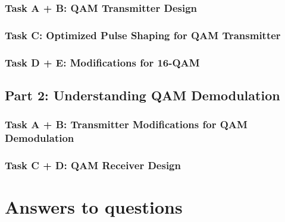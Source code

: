 \documentclass{article}
\begin{document}
\subsubsection{Task A + B: QAM Transmitter Design}

\subsubsection{Task C: Optimized Pulse Shaping for QAM Transmitter}

\subsubsection{Task D + E: Modifications for 16-QAM}

\subsection{Part 2: Understanding QAM Demodulation}

\subsubsection{Task A + B: Transmitter Modifications for QAM Demodulation}

\subsubsection{Task C + D: QAM Receiver Design}



\section{Answers to questions}
\end{document}
